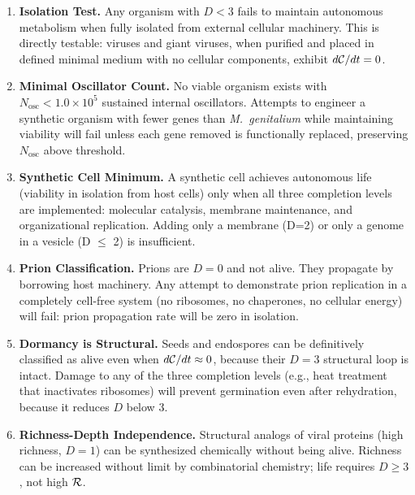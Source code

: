 \begin{enumerate}[label=\textbf{P\arabic*.}, leftmargin=*]

  \item \textbf{Isolation Test.} Any organism with $D < 3$ fails to maintain
        autonomous metabolism when fully isolated from external cellular
        machinery. This is directly testable: viruses and giant viruses,
        when purified and placed in defined minimal medium with no cellular
        components, exhibit $d\mathcal{C}/dt = 0$.

  \item \textbf{Minimal Oscillator Count.} No viable organism exists with
        $N_{\mathrm{osc}} < 1.0 \times 10^5$ sustained internal oscillators.
        Attempts to engineer a synthetic organism with fewer genes than
        \textit{M.~genitalium} while maintaining viability will fail unless
        each gene removed is functionally replaced, preserving $N_{\mathrm{osc}}$
        above threshold.

  \item \textbf{Synthetic Cell Minimum.} A synthetic cell achieves autonomous
        life (viability in isolation from host cells) only when all three
        completion levels are implemented: molecular catalysis, membrane
        maintenance, and organizational replication. Adding only a membrane
        (D=2) or only a genome in a vesicle (D $\leq$ 2) is insufficient.

  \item \textbf{Prion Classification.} Prions are $D = 0$ and not alive.
        They propagate by borrowing host machinery. Any attempt to demonstrate
        prion replication in a completely cell-free system (no ribosomes, no
        chaperones, no cellular energy) will fail: prion propagation rate will
        be zero in isolation.

  \item \textbf{Dormancy is Structural.} Seeds and endospores can be
        definitively classified as alive even when $d\mathcal{C}/dt \approx 0$,
        because their $D = 3$ structural loop is intact. Damage to any of
        the three completion levels (e.g., heat treatment that inactivates
        ribosomes) will prevent germination even after rehydration, because
        it reduces $D$ below 3.

  \item \textbf{Richness-Depth Independence.} Structural analogs of viral
        proteins (high richness, $D = 1$) can be synthesized chemically
        without being alive. Richness can be increased without limit by
        combinatorial chemistry; life requires $D \geq 3$, not high $\mathcal{R}$.

\end{enumerate}


